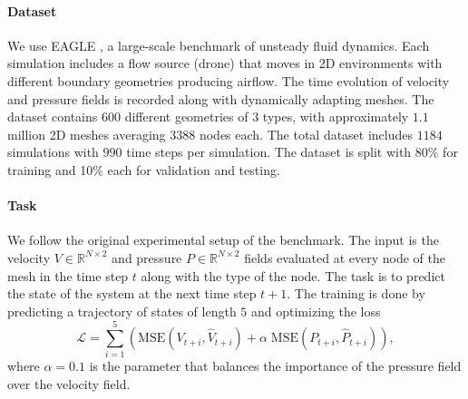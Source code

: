\vspace{-5pt}
\paragraph{Dataset}
We use EAGLE \cite{Janny2023EagleLL}, a large-scale benchmark of unsteady fluid dynamics. Each simulation includes a flow source (drone) that moves in 2D environments with different boundary geometries producing airflow. The time evolution of velocity and pressure fields is recorded along with dynamically adapting meshes. The dataset contains $600$ different geometries of $3$ types, with approximately $1.1$ million 2D meshes averaging $3388$ nodes each. The total dataset includes $1184$ simulations with $990$ time steps per simulation. The dataset is split with 80\% for training and 10\% each for validation and testing.

\vspace{-5pt}
\paragraph{Task}
We follow the original experimental setup of the benchmark. The input is the velocity $V \in \mathbb{R}^{N \times 2}$ and pressure $P \in \mathbb{R}^{N \times 2}$ fields evaluated at every node of the mesh in the time step $t$ along with the type of the node. The task is to predict the state of the system at the next time step $t+1$. The training is done by predicting a trajectory of states of length $5$ and optimizing the loss
\vspace{-5pt}
\begin{equation*}
\mathcal{L} = \sum_{i=1}^{5} \left( \text{MSE}(V_{t+i}, \hat{V}_{t+i}) + \alpha \;\text{MSE}(P_{t+i}, \hat{P}_{t+i}) \right),
\end{equation*}
where $\alpha = 0.1$ is the parameter that balances the importance of the pressure field over the velocity field.

\vspace{-5pt}
